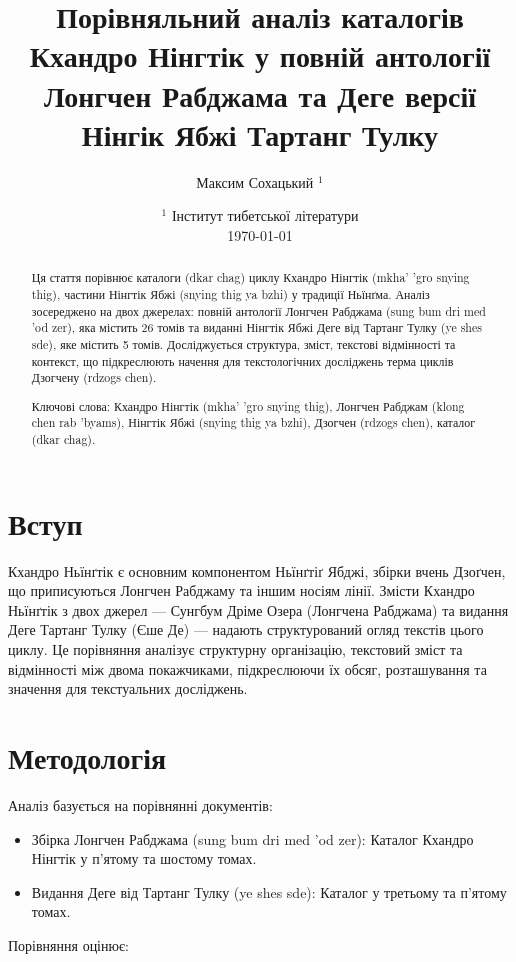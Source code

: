 \documentclass{article}
\title{Порівняльний аналіз каталогів Кхандро Нінгтік у повній антології Лонгчен Рабджама та Деге версії Нінгік Ябжі Тартанг Тулку}
\author{Максим Сохацький $^1$}
\date{ $^1$ Інститут тибетської літератури \\ \today }
\begin{document}
\maketitle

\begin{abstract}
Ця стаття порівнює каталоги (dkar chag) циклу Кхандро Нінгтік (mkha' 'gro snying thig),
частини Нінгтік Ябжі (snying thig ya bzhi) у традиції Ньїнґма. Аналіз зосереджено на двох
джерелах: повній антології Лонгчен Рабджама (sung bum dri med 'od zer), яка містить 26 томів
та виданні Нінгтік Ябжі Деге від Тартанг Тулку (ye shes sde), яке містить 5 томів.
Досліджується структура, зміст, текстові відмінності та контекст, що підкреслюють
начення для текстологічних досліджень терма циклів Дзогчену (rdzogs chen).

Ключові слова: Кхандро Нінгтік (mkha' 'gro snying thig), Лонгчен Рабджам (klong chen rab 'byams),
  Нінгтік Ябжі (snying thig ya bzhi), Дзогчен (rdzogs chen), каталог (dkar chag).
\end{abstract}

\newpage

\section{Вступ}

Кхандро Ньїнґтік є основним компонентом Ньїнґтіґ Ябджі, збірки вчень Дзоґчен,
що приписуються Лонгчен Рабджаму та іншим носіям лінії. Змісти Кхандро
Ньїнґтік з двох джерел — Сунгбум Дріме Озера (Лонгчена Рабджама) та видання
Деге Тартанг Тулку (Єше Де) — надають структурований огляд текстів цього циклу.
Це порівняння аналізує структурну організацію, текстовий зміст та відмінності між
двома покажчиками, підкреслюючи їх обсяг, розташування та значення для текстуальних досліджень.

\section{Методологія}
Аналіз базується на порівнянні документів:
\begin{itemize}
    \item Збірка Лонгчен Рабджама (sung bum dri med 'od zer): Каталог Кхандро Нінгтік у п'ятому та шостому томах.
    \item Видання Деге від Тартанг Тулку (ye shes sde): Каталог у третьому та п'ятому томах.
\end{itemize}

Порівняння оцінює:
\end{document}
